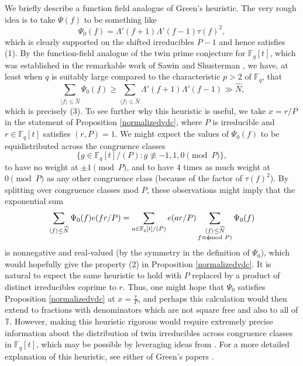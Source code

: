 \documentclass{article}
\theoremstyle{definition}
\theoremstyle{definition}
\theoremstyle{remark}
\newcommand{\F}{\mathbb{F}_q[t]}
\newcommand{\1}{\mathbf{1}}
\numberwithin{equation}{section}
\begin{document}
We briefly describe a function field analogue of Green's heuristic. The very rough idea is to take $\Psi(f)$ to be something like 
\[\Psi_0(f)=\Lambda'(f+1)\Lambda'(f-1)\tau(f)^2,\] 
which is clearly supported on the shifted irreducibles $P-1$ and hence satisfies (1). By the function-field analogue of the twin prime conjecture for $\F$, which was established in the remarkable work of Sawin and Shusterman \cite{SawinShusterman2022}, we have, at least when $q$ is suitably large compared to the characteristic $p>2$ of $\mathbb{F}_q$, that
\[\sum_{\langle f \rangle \leq \widehat{N}}\Psi_0(f)\ge\sum_{\langle f \rangle \leq \widehat{N}}\Lambda'(f+1)\Lambda'(f-1)\gg \widehat{N},\]
which is precisely (3). To see further why this heuristic is useful, we take $x=r\slash P$ in the statement of Proposition \ref{normalizedvdc}, where $P$ is irreducible and $r\in\F$ satisfies $(r,P)=1$. We might expect the values of $\Psi_0(f)$ to be equidistributed across the congruence classes 
\[\{g\in \F\slash(P): g\not\equiv -1,1,0\pmod P\},\] 
to have no weight at $\pm 1\pmod{P}$, and to have $4$ times as much weight at $0\pmod{P}$ as any other congruence class (because of the factor of $\tau(f)^2$). By splitting over congruence classes mod $P$, these observations might imply that the exponential sum 
\[\sum_{\langle f\rangle \leq \widehat{N}} \Psi_0(f)e(fr\slash P)=\sum_{a\in\F/(P)}e(ar/P)\sum_{\substack{\langle f\rangle\leq \widehat{N}\\f\equiv a\hspace*{-2.5mm}\pmod{P}}}\Psi_0(f)\]
is nonnegative and real-valued (by the symmetry in the definition of $\Psi_0$), which would hopefully give the property (2) in Proposition \ref{normalizedvdc}. It is natural to expect the same heuristic to hold with $P$ replaced by a product of distinct irreducibles coprime to $r$. Thus, one might hope that $\Psi_0$ satisfies Proposition \ref{normalizedvdc} at $x=\frac{r}{P}$, and perhaps this calculation would then extend to fractions with denominators which are not square free and also to all of $\mathbb{T}$. However, making this heuristic rigorous would require extremely precise information about the distribution of twin irreducibles across congruence classes in $\F$, which may be possible by leveraging ideas from \cite{SawinShusterman2022}. For a more detailed explanation of this heuristic, see either of Green's papers \cite{Green23,Green}. 
\end{document}
